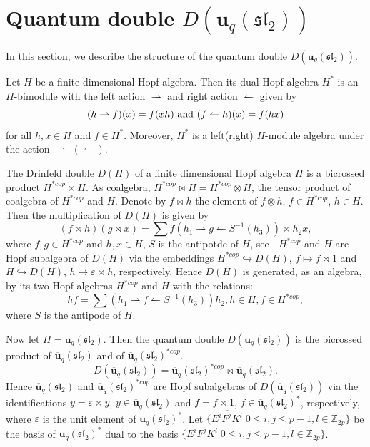 \documentclass[10pt,oneside]{amsart}
\theoremstyle{definition}
\newcommand{\selabel}[1]{\label{se:#1}}
\def\<{\leqslant}
\def\ot{\otimes}
\begin{document}
\section{Quantum double $D(\mathbf{\overline{u}}_q(\mathfrak{sl_2}))$}\selabel{3}

In this section, we describe the structure of the quantum double $D(\mathbf{\overline{u}}_q(\mathfrak{sl_2}))$.

Let $H$ be a finite dimensional Hopf algebra. Then its dual Hopf algebra $H^*$ is an $H$-bimodule with the left action $\rightharpoonup$ and right action $\leftharpoonup$ given by
$$(h\rightharpoonup f)(x)=f(xh) \  {\rm and} \  (f\leftharpoonup h)(x)=f(hx)$$ for all $h,x\in H$ and $f\in H^*$. Moreover, $H^*$ is a left(right) $H$-module algebra under the action $\rightharpoonup$ $(\leftharpoonup)$.

The Drinfeld double $D(H)$ of a finite dimensional Hopf algebra $H$ is a bicrossed product $H^{*cop}\bowtie H$. As coalgebra, $H^{*cop}\bowtie H=H^{*cop}\ot H$, the tensor product of coalgebra of $H^{*cop}$ and $H$. Denote by $f\bowtie h$ the element of $f\ot h$, $f\in H^{* cop}$, $h\in H$. Then the multiplication of $D(H)$ is given by $$(f\bowtie h)(g\bowtie x)=\sum f(h_1\rightharpoonup g\leftharpoonup S^{-1}(h_3))\bowtie h_2 x,$$ where $f,g\in H^{*cop}$ and $h,x\in H$, $S$ is the antipotde of $H$, see \cite{Ka,Mo}. $H^{*cop}$ and $H$ are Hopf subalgebra of $D(H)$ via the embeddings $H^{* cop}\hookrightarrow D(H)$, $f\mapsto f\bowtie 1$ and $H\hookrightarrow D(H)$, $h\mapsto \varepsilon\bowtie h$, respectively. Hence $D(H)$ is generated, as an algebra, by its two Hopf algebras $H^{*cop}$ and $H$ with the relations:
$$hf=\sum(h_1\rightharpoonup f\leftharpoonup S^{-1}(h_3))h_2, h\in H, f\in H^{*cop},$$ where $S$ is the antipode of $H$.

Now let $H=\mathbf{\overline{u}}_q(\mathfrak{sl_2})$. Then
the quantum double $D(\mathbf{\overline{u}}_q(\mathfrak{sl_2}))$  is the bicrossed product of $\mathbf{\overline{u}}_q(\mathfrak{sl_2})$ and of $\mathbf{\overline{u}}_q(\mathfrak{sl_2})^ {*cop}$.
$$D(\mathbf{\overline{u}}_q(\mathfrak{sl_2}))= \mathbf{\overline{u}}_q(\mathfrak{sl_2})^ {*cop}\bowtie \mathbf{\overline{u}}_q(\mathfrak{sl_2}).$$
Hence $\mathbf{\overline{u}}_q(\mathfrak{sl_2})$ and $\mathbf{\overline{u}}_q(\mathfrak{sl_2})^ {*cop}$
are Hopf subalgebras of $D(\mathbf{\overline{u}}_q(\mathfrak{sl_2}))$  via the identifications $y=\varepsilon\bowtie y$, $y\in \mathbf{\overline{u}}_q(\mathfrak{sl_2})$ and $f=f\bowtie 1$, $f\in \mathbf{\overline{u}}_q(\mathfrak{sl_2})^*$, respectively, where $\varepsilon$ is the unit element of $\mathbf{\overline{u}}_q(\mathfrak{sl_2})^*$. Let
$\{\overline{E^iF^jK^l}|0\<i,j\<p-1,l\in \mathbb{Z}_{2p}\}$ be the basis of $\mathbf{\overline{u}}_q(\mathfrak{sl_2})^*$ dual to the basis $\{E^iF^jK^l|0\<i,j\<p-1,l\in \mathbb{Z}_{2p}\}$.
\end{document}
